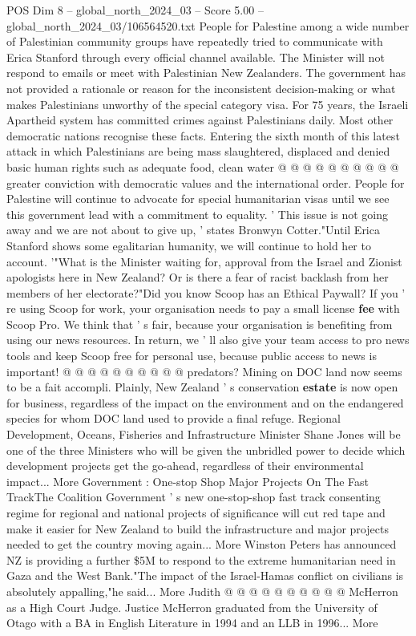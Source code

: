 \begin{textsample}{POS Dim 8 – global\_north\_2024\_03 – Score 5.00 – global\_north\_2024\_03/106564520.txt}
People for Palestine among a wide number of Palestinian community groups have repeatedly tried to communicate with Erica Stanford through every official channel available.
The Minister will not respond to emails or meet with Palestinian New Zealanders.
The government has not provided a rationale or reason for the inconsistent decision-making or what makes Palestinians unworthy of the special category visa.
For 75 years, the Israeli Apartheid system has committed crimes against Palestinians daily.
Most other democratic nations recognise these facts.
Entering the sixth month of this latest attack in which Palestinians are being mass slaughtered, displaced and denied basic human rights such as adequate food, clean water @ @ @ @ @ @ @ @ @ @ greater conviction with democratic values and the international order.
People for Palestine will continue to advocate for special humanitarian visas until we see this government lead with a commitment to equality. ' This issue is not going away and we are not about to give up, ' states Bronwyn Cotter."Until Erica Stanford shows some egalitarian humanity, we will continue to hold her to account. '"What is the Minister waiting for, approval from the Israel and Zionist apologists here in New Zealand?
Or is there a fear of racist backlash from her members of her electorate?"Did you know Scoop has an Ethical Paywall?
If you ' re using Scoop for work, your organisation needs to pay a small license \textbf{fee} with Scoop Pro.
We think that ' s fair, because your organisation is benefiting from using our news resources.
In return, we ' ll also give your team access to pro news tools and keep Scoop free for personal use, because public access to news is important! @ @ @ @ @ @ @ @ @ @ predators?
Mining on DOC land now seems to be a fait accompli.
Plainly, New Zealand ' s conservation \textbf{estate} is now open for business, regardless of the impact on the environment and on the endangered species for whom DOC land used to provide a final refuge.
Regional Development, Oceans, Fisheries and Infrastructure Minister Shane Jones will be one of the three Ministers who will be given the unbridled power to decide which development projects get the go-ahead, regardless of their environmental impact...
More Government : One-stop Shop Major Projects On The Fast TrackThe Coalition Government ' s new one-stop-shop fast track consenting regime for regional and national projects of significance will cut red tape and make it easier for New Zealand to build the infrastructure and major projects needed to get the country moving again...
More Winston Peters has announced NZ is providing a further \$5M to respond to the extreme humanitarian need in Gaza and the West Bank."The impact of the Israel-Hamas conflict on civilians is absolutely appalling,"he said...
More Judith @ @ @ @ @ @ @ @ @ @ McHerron as a High Court Judge.
Justice McHerron graduated from the University of Otago with a BA in English Literature in 1994 and an LLB in 1996...
More

\end{textsample}
